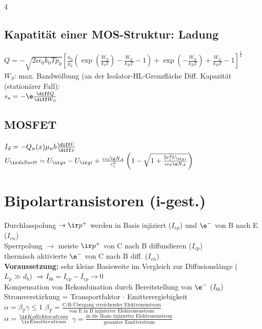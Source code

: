 \documentclass[fs, footer]{latex4ei_custom}
\begin{document}
\begin{multicols*}{4}
	\subsection{Kapatität einer MOS-Struktur: Ladung}
	$Q=-\sqrt{2\epsilon\epsilon_0k_0Tp_0}\left[\frac{n_0}{p_0}\left(\exp\left(\frac{W_S}{k_bT}\right)-\frac{W_S}{k_BT}-1\right)+\exp\left(-\frac{W_S}{k_BT}\right)+\frac{W_S}{k_BT}-1\right]^\frac{1}{2}$\\
	$W_S$: max. Bandwölbung (an der Isolator-HL-Grenzfläche
	Diff. Kapazität (stationärer Fall):\\
	$s_s = -\e\frac{\diff Q}{\diff W_S}$\\
	\subsection{MOSFET}
	$I_d=-Q_n(x)\mu_nb\frac{\diff U}{\diff x}$\\
	$U_{\ir dsSaett} = U_{\ir gs}-U_{\ir gi}+\frac{\epsilon\epsilon_0\e N_A}{c_i^2}\left(1-\sqrt{1+\frac{2c_i^2U_{\ir gs}}{\epsilon\epsilon_0\e N_A}}\right)$\\
	\section{Bipolartransistoren (i-gest.)}
	Durchlasspolung $\rightarrow \ir p^+$ werden in Basis injiziert ($I_{ep}$) und $\e^-$ von B nach E ($I_{en}$)\\
	Sperrpolung $\rightarrow$ meiste $\ir p^+$ von C nach B diffundieren ($I_{cp}$)\\
	thermisch aktivierte $\e^-$ von C nach B diff. ($I_{cn}$)\\
	\textbf{Voraussetzung:} sehr kleine Basisweite im Vergleich zur Diffusionslänge ($L_p \gg d_b$) $\Rightarrow I_{bb} = I_{ep} - I_{cp} \rightarrow 0$ \\
	Kompensation von Rekombination durch Bereitstellung von $\e^-$ ($I_{bb}$)\\
	Stromverstärkung = Transportfaktor $\cdot$ Emitterergiebigkeit\\
	$\alpha = \beta_T\gamma \leq 1$\qquad
	$\beta_T = \frac{\text{C-B-Übergang erreichender Elektronenstrom}}{\text{von E in B injizierter Elektronenstrom}}$\\
	$\alpha = \frac{\ir Kollektorstrom}{\ir Emitterstrom}$\qquad
	$\gamma = \frac{\text{in die Basis injizierter Elektronenstrom}}{\text{gesamter Emitterstrom}}$\\


\end{multicols*}
\end{document}

